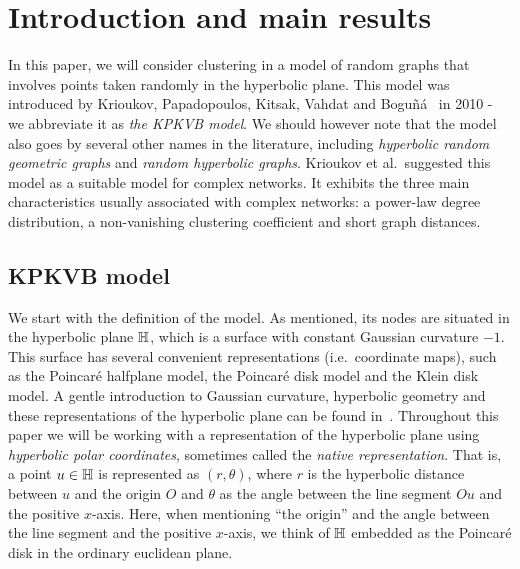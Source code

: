 \section{Introduction and main results}

In this paper, we will consider clustering in a model of random graphs that involves points taken randomly in the hyperbolic plane. This model was introduced by Krioukov, Papadopoulos, Kitsak, Vahdat and Bogu\~{n}\'a~\cite{krioukov2010hyperbolic} in 
2010 - we abbreviate it as \emph{the KPKVB model}. We should however note that the model also goes by several other names in the literature, including {\em hyperbolic random geometric graphs} and {\em random hyperbolic graphs}. Krioukov et al.~suggested this model as a suitable model for complex networks. It exhibits the three main characteristics usually associated with complex networks: a power-law degree distribution, a non-vanishing clustering coefficient and short graph distances.

\subsection{KPKVB model}
We start with the definition of the model. As mentioned, its nodes are situated in the hyperbolic plane ${\mathbb H}$, which is a surface with constant Gaussian curvature $-1$. This surface has several convenient representations (i.e.~coordinate maps), such as the Poincar\'e halfplane model, the Poincar\'e disk model and the Klein disk model. A gentle introduction to Gaussian curvature, hyperbolic geometry and these representations of the hyperbolic plane can be found in~\cite{stillwell2012geometry}. Throughout this paper we will be working with a representation of the hyperbolic plane using {\em hyperbolic polar coordinates}, sometimes called the {\em native representation}. That is, a point $u \in {\mathbb H}$ is represented as $(r,\theta)$, where $r$ is the hyperbolic distance between $u$ and the origin $O$ and $\theta$ as the angle between the line segment $Ou$ and the positive $x$-axis. 
Here, when mentioning ``the origin'' and the angle between the line segment and the positive $x$-axis, we think of ${\mathbb H}$ embedded as the Poincar\'e disk in the ordinary euclidean plane.

